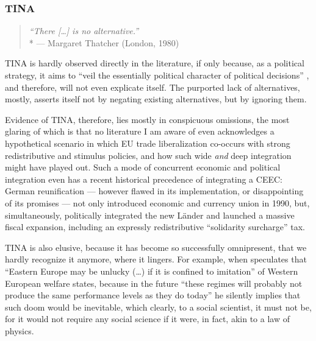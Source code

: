 \subsubsection{TINA}

\begin{quote}
	\emph{``There [\ldots] is no alternative.''}
	\\*
	--- Margaret Thatcher (London, 1980)
\end{quote}

TINA is hardly observed directly in the literature, if only because, as a political strategy, it aims to ``veil the essentially political character of political decisions'' \citep[314]{Bluhdorn-2007-aa}, and therefore, will not even explicate itself.
The purported lack of alternatives, mostly, asserts itself not by negating existing alternatives, but by ignoring them.

Evidence of TINA, therefore, lies mostly in conspicuous omissions, the most glaring of which is that no literature I am aware of even acknowledges a hypothetical scenario in which \gls{EU} trade liberalization co-occurs with strong redistributive and stimulus policies, and how such wide \emph{and} deep integration might have played out.
Such a mode of concurrent economic and political integration even has a recent historical precedence of integrating a \gls{CEEC}:
German reunification --- however flawed in its implementation, or disappointing of its promises --- not only introduced economic and currency union in 1990, but, simultaneously, politically integrated the new Länder and launched a massive fiscal expansion, including an expressly redistributive ``solidarity surcharge'' tax.

TINA is also elusive, because it has become so successfully omnipresent, that we hardly recognize it anymore, where it lingers.
For example, when \citeauthor{Kovasc} speculates that ``Eastern Europe may be unlucky (\ldots) if it is confined to imitation'' of Western European welfare states, because in the future ``these regimes will probably not produce the same performance levels as they do today'' he silently implies that such doom would be inevitable, which clearly, to a social scientist, it must not be, for it would not require any social science if it were, in fact, akin to a law of physics.

